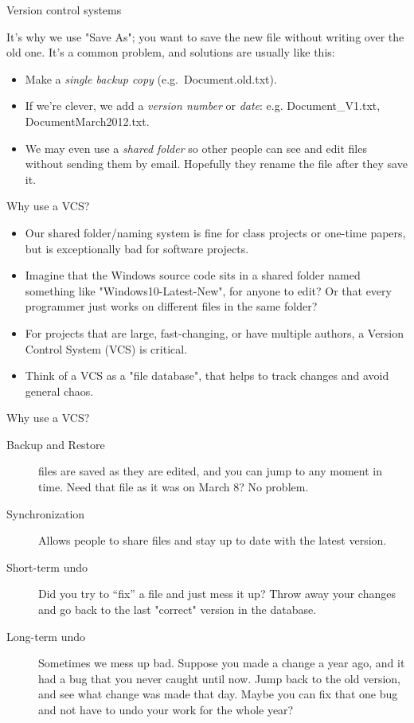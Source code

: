 \documentclass[aspectratio=169]{beamer}
\begin{document}
\begin{frame}{Version control systems}

It's why we use "Save As"; you want to save the new file without writing
over the old one. It's a common problem, and solutions are usually like
this:

\begin{itemize}
\item
  Make a \emph{single backup copy} (e.g.~Document.old.txt).
\item
  If we're clever, we add a \emph{version number} or \emph{date}: e.g.
  Document\_V1.txt, DocumentMarch2012.txt.
\item
  We may even use a \emph{shared folder} so other people can see and
  edit files without sending them by email. Hopefully they rename the
  file after they save it.
\end{itemize}

\end{frame}

\begin{frame}{Why use a VCS?}

\begin{itemize}
\item Our shared folder/naming system is fine for class projects or one-time
papers, but is exceptionally bad for software projects.
\item Imagine
that the Windows source code sits in a shared folder named something
like "Windows10-Latest-New", for anyone to edit? Or that every programmer
just works on different files in the same folder?
\item For projects that are large, fast-changing, or have multiple authors, a
Version Control System (VCS) is critical.
\item Think of a VCS as a "file
database", that helps to track changes and avoid general chaos.
\end{itemize}

\end{frame}

\begin{frame}{Why use a VCS?}

\begin{description}
\item[Backup and Restore] files are saved as they are edited, and
  you can jump to any moment in time. Need that file as it was on March
  8? No problem.
\item[Synchronization] Allows people to share files and stay up
  to date with the latest version.
\item[Short-term undo] Did you try to ``fix'' a file and just mess
  it up? Throw away your changes and go back to the last "correct"
  version in the database.
\item[Long-term undo] Sometimes we mess up bad. Suppose you made
  a change a year ago, and it had a bug that you never caught until now.
  Jump back to the old version, and see what change was made that day.
  Maybe you can fix that one bug and not have to undo your work for the
  whole year?
\end{description}
\end{frame}
\end{document}
